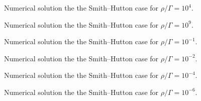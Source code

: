 \begin{figure}[h]
	\centering
	
	\caption{Numerical solution the the Smith--Hutton case for $\rho / \Gamma = 10^4$.}
	\label{fig:smith_hutton_N201_Pe1.0e+04}
\end{figure}

\begin{figure}[h]
	\centering
	
	\caption{Numerical solution the the Smith--Hutton case for $\rho / \Gamma = 10^9$.}
	\label{fig:smith_hutton_N201_Pe1.0e+09}
\end{figure}

\begin{figure}[h]
	\centering
	
	\caption{Numerical solution the the Smith--Hutton case for $\rho / \Gamma = 10^{-1}$.}
	\label{fig:smith_hutton_N201_Pe1.0e-01}
\end{figure}

\begin{figure}[h]
	\centering
	
	\caption{Numerical solution the the Smith--Hutton case for $\rho / \Gamma = 10^{-2}$.}
	\label{fig:smith_hutton_N201_Pe1.0e-02}
\end{figure}

\begin{figure}[h]
	\centering
	
	\caption{Numerical solution the the Smith--Hutton case for $\rho / \Gamma = 10^{-4}$.}
	\label{fig:smith_hutton_N201_Pe1.0e-04}
\end{figure}

\begin{figure}[h]
	\centering
	
	\caption{Numerical solution the the Smith--Hutton case for $\rho / \Gamma = 10^{-6}$.}
	\label{fig:smith_hutton_N201_Pe1.0e-06}
\end{figure}




